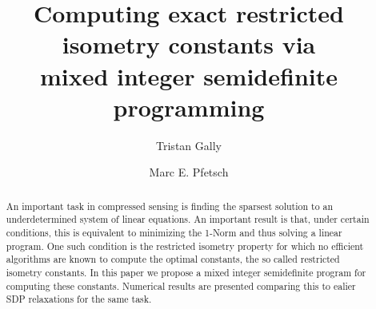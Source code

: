 \documentclass[a4paper,11pt,1p]{elsarticle}
\begin{document}
\title{Computing exact restricted isometry constants via\\ mixed integer semidefinite programming}
\author[tud]{Tristan Gally}
\author[tud]{Marc E. Pfetsch}
\address[tud]{Technische Universit\"at Darmstadt, Department of Mathematics,\\ Dolivostra\ss e 15, 64293 Darmstadt, Germany}

\begin{abstract}
An important task in compressed sensing is finding the sparsest solution to an underdetermined system of linear equations. An important result is that, under certain conditions, this is equivalent to minimizing the 1-Norm and thus
solving a linear program. One such condition is the restricted isometry property for which no efficient algorithms are known to compute the optimal constants, the so called restricted isometry constants. In this paper we propose a
mixed integer semidefinite program for computing these constants. Numerical results are presented comparing this to ealier SDP relaxations for the same task.
\end{abstract}

\maketitle
\end{document}
